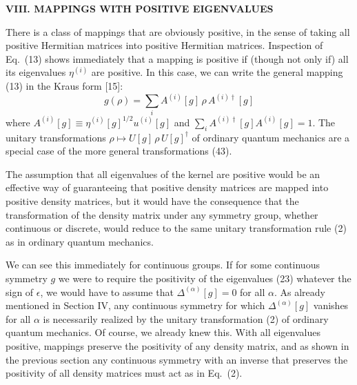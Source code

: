 \documentclass[12pt]{article}
\begin{document}
\vspace{20pt}

\begin{center}
{\bf VIII.  MAPPINGS WITH POSITIVE EIGENVALUES}
\end{center}

There is a class of mappings that are obviously positive, in the sense of taking all positive Hermitian matrices into positive Hermitian matrices.  Inspection of Eq.~(13)  shows immediately that a mapping is positive if (though not only if) all its eigenvalues $\eta^{(i)}$ are positive.  In this case, we can write the general mapping (13) in the Kraus form [15]:
\begin{equation}
g(\rho)=\sum_i A^{(i)}[g]\,\rho\,A^{(i)\dagger}[g]
\end{equation}
where $A^{(i)}[g]\equiv \eta^{(i)}[g]^{1/2} u^{(i)}[g]$ and $\sum_i A^{(i)\dagger}[g]A^{(i)}[g]=1$.  The  unitary transformations  $\rho\mapsto U[g]\,\rho\,U[g]^\dagger$ of ordinary quantum mechanics are a special case of the more general transformations (43). 

The assumption that all eigenvalues of the kernel are positive would be an effective way of guaranteeing that positive density matrices are mapped into positive density matrices, but it would have the  consequence that the transformation of the density matrix under any symmetry group, whether continuous or discrete, would reduce to the same unitary transformation rule (2)  as in ordinary quantum mechanics.  

We can see this immediately for continuous groups.  If for some continuous symmetry $g$ we were to require  the positivity of the eigenvalues (23) whatever the sign of $\epsilon$, we would have to assume that $\Delta^{(\alpha)}[g]=0$ for all $\alpha$.  As already mentioned in Section IV, any continuous symmetry for which $\Delta^{(\alpha)}[g]$ vanishes for all $\alpha$ is necessarily realized by the unitary transformation (2) of ordinary quantum mechanics.  Of course, we already knew this.  With all eigenvalues positive, mappings preserve the positivity of any density matrix, and as shown in the previous section any continuous symmetry with an inverse that preserves the positivity of all density matrices must act as in Eq.~(2).
\end{document}
